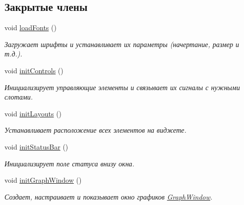 \subsection*{Закрытые члены}
\begin{DoxyCompactItemize}
\item 
void \hyperlink{class_main_window_af0898886d5a3e9c0b336312e959daae6}{load\+Fonts} ()
\begin{DoxyCompactList}\small\item\em Загружает шрифты и устанавливает их параметры (начертание, размер и т.\+д.). \end{DoxyCompactList}\item 
\hypertarget{class_main_window_ae2496e2e0162c1916db2a855dc2ca282}{}\label{class_main_window_ae2496e2e0162c1916db2a855dc2ca282} 
void \hyperlink{class_main_window_ae2496e2e0162c1916db2a855dc2ca282}{init\+Controls} ()
\begin{DoxyCompactList}\small\item\em Инициализирует управляющие элементы и связывает их сигналы с нужными слотами. \end{DoxyCompactList}\item 
\hypertarget{class_main_window_a2e43acb16129df179b891a7f5d2c3694}{}\label{class_main_window_a2e43acb16129df179b891a7f5d2c3694} 
void \hyperlink{class_main_window_a2e43acb16129df179b891a7f5d2c3694}{init\+Layouts} ()
\begin{DoxyCompactList}\small\item\em Устанавливает расположение всех элементов на виджете. \end{DoxyCompactList}\item 
\hypertarget{class_main_window_ab03270fd7d6947737a5e3d57684c8547}{}\label{class_main_window_ab03270fd7d6947737a5e3d57684c8547} 
void \hyperlink{class_main_window_ab03270fd7d6947737a5e3d57684c8547}{init\+Status\+Bar} ()
\begin{DoxyCompactList}\small\item\em Инициализирует поле статуса внизу окна. \end{DoxyCompactList}\item 
\hypertarget{class_main_window_ace6b00b69525fa5b1ce8808c9832dedc}{}\label{class_main_window_ace6b00b69525fa5b1ce8808c9832dedc} 
void \hyperlink{class_main_window_ace6b00b69525fa5b1ce8808c9832dedc}{init\+Graph\+Window} ()
\begin{DoxyCompactList}\small\item\em Создает, настраивает и показывает окно графиков \hyperlink{class_graph_window}{Graph\+Window}. \end{DoxyCompactList}\item 

\end{DoxyCompactItemize}
